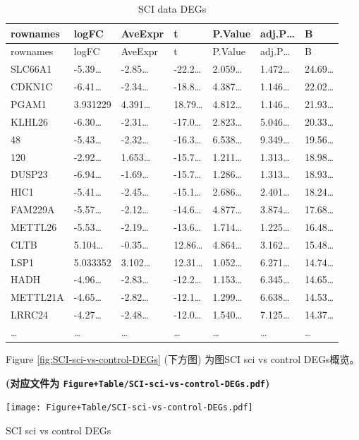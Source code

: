 \documentclass[
]{article}
\begin{document}
\begin{longtable}[]{@{}lllllll@{}}
\caption{\label{tab:SCI-data-DEGs}SCI data DEGs}\tabularnewline
\toprule
rownames & logFC & AveExpr & t & P.Value & adj.P\ldots{} & B\tabularnewline
\midrule
\endfirsthead
\toprule
rownames & logFC & AveExpr & t & P.Value & adj.P\ldots{} & B\tabularnewline
\midrule
\endhead
SLC66A1 & -5.39\ldots{} & -2.85\ldots{} & -22.2\ldots{} & 2.059\ldots{} & 1.472\ldots{} & 24.69\ldots{}\tabularnewline
CDKN1C & -6.41\ldots{} & -2.34\ldots{} & -18.8\ldots{} & 4.387\ldots{} & 1.146\ldots{} & 22.02\ldots{}\tabularnewline
PGAM1 & 3.931229 & 4.391\ldots{} & 18.79\ldots{} & 4.812\ldots{} & 1.146\ldots{} & 21.93\ldots{}\tabularnewline
KLHL26 & -6.30\ldots{} & -2.31\ldots{} & -17.0\ldots{} & 2.823\ldots{} & 5.046\ldots{} & 20.33\ldots{}\tabularnewline
48 & -5.43\ldots{} & -2.32\ldots{} & -16.3\ldots{} & 6.538\ldots{} & 9.349\ldots{} & 19.56\ldots{}\tabularnewline
120 & -2.92\ldots{} & 1.653\ldots{} & -15.7\ldots{} & 1.211\ldots{} & 1.313\ldots{} & 18.98\ldots{}\tabularnewline
DUSP23 & -6.94\ldots{} & -1.69\ldots{} & -15.7\ldots{} & 1.286\ldots{} & 1.313\ldots{} & 18.93\ldots{}\tabularnewline
HIC1 & -5.41\ldots{} & -2.45\ldots{} & -15.1\ldots{} & 2.686\ldots{} & 2.401\ldots{} & 18.24\ldots{}\tabularnewline
FAM229A & -5.57\ldots{} & -2.12\ldots{} & -14.6\ldots{} & 4.877\ldots{} & 3.874\ldots{} & 17.68\ldots{}\tabularnewline
METTL26 & -5.53\ldots{} & -2.19\ldots{} & -13.6\ldots{} & 1.714\ldots{} & 1.225\ldots{} & 16.48\ldots{}\tabularnewline
CLTB & 5.104\ldots{} & -0.35\ldots{} & 12.86\ldots{} & 4.864\ldots{} & 3.162\ldots{} & 15.48\ldots{}\tabularnewline
LSP1 & 5.033352 & 3.102\ldots{} & 12.31\ldots{} & 1.052\ldots{} & 6.271\ldots{} & 14.74\ldots{}\tabularnewline
HADH & -4.96\ldots{} & -2.83\ldots{} & -12.2\ldots{} & 1.153\ldots{} & 6.345\ldots{} & 14.65\ldots{}\tabularnewline
METTL21A & -4.65\ldots{} & -2.82\ldots{} & -12.1\ldots{} & 1.299\ldots{} & 6.638\ldots{} & 14.53\ldots{}\tabularnewline
LRRC24 & -4.27\ldots{} & -2.48\ldots{} & -12.0\ldots{} & 1.540\ldots{} & 7.125\ldots{} & 14.37\ldots{}\tabularnewline
\ldots{} & \ldots{} & \ldots{} & \ldots{} & \ldots{} & \ldots{} & \ldots{}\tabularnewline
\bottomrule
\end{longtable}

Figure \ref{fig:SCI-sci-vs-control-DEGs} (下方图) 为图SCI sci vs control DEGs概览。

\textbf{(对应文件为 \texttt{Figure+Table/SCI-sci-vs-control-DEGs.pdf})}

\def\@captype{figure}
\begin{center}
\texttt{[image: Figure+Table/SCI-sci-vs-control-DEGs.pdf]}
\caption{SCI sci vs control DEGs}\label{fig:SCI-sci-vs-control-DEGs}
\end{center}
\end{document}
